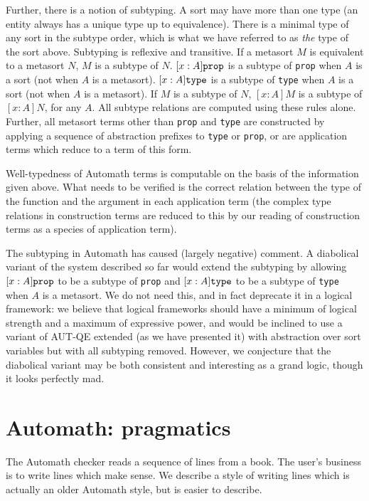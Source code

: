 \documentclass{article}
\begin{document}
Further, there is a notion of subtyping.  A sort may have more than one type (an entity always has a unique type up to equivalence).  There is a minimal type of any sort in the subtype order, which is what we have referred to as {\em the\/} type of the sort above.  Subtyping is reflexive and transitive.  If a metasort $M$ is equivalent to a metasort $N$, $M$ is a subtype of $N$.  $[x:A]{\tt prop}$ is a subtype of {\tt prop} when $A$ is a sort (not when $A$ is a metasort).  $[x:A]{\tt type}$ is a subtype of {\tt type} when $A$ is a sort (not when $A$ is a metasort).  If $M$ is a subtype of $N$, $[x:A]M$ is a subtype of $[x:A]N$, for any $A$.  All subtype relations are computed using these rules alone.  Further, all metasort terms other than {\tt prop} and {\tt type} are constructed by applying a sequence of abstraction prefixes to
{\tt type} or {\tt prop}, or are application terms which reduce to a term of this form.

Well-typedness of Automath terms is computable on the basis of the information given above.  What needs to be verified is the correct relation between the type of the function and the argument in each application term (the complex type relations in construction terms are reduced to this by our reading of construction terms as a species of application term).

The subtyping in Automath has caused (largely negative) comment.  A diabolical variant of the system described so far would extend the subtyping by
allowing $[x:A]{\tt prop}$ to be a subtype of {\tt prop} and $[x:A]{\tt type}$ to be a subtype of {\tt type} when $A$ is a metasort.  We do not need this, and in fact deprecate it in a logical framework:  we believe that logical frameworks should have a minimum of logical strength and a maximum of expressive power, and would be inclined to use a variant of AUT-QE extended (as we have presented it) with abstraction over sort variables but with all subtyping removed.  However, we conjecture that the diabolical variant may be both consistent and interesting as a grand logic, though it looks perfectly mad.


\section{Automath:  pragmatics}

The Automath checker reads a sequence of lines from a book.  The user's business is to write lines which make sense.  We describe a style of writing lines which is actually an older Automath style, but is easier to describe.
\end{document}
